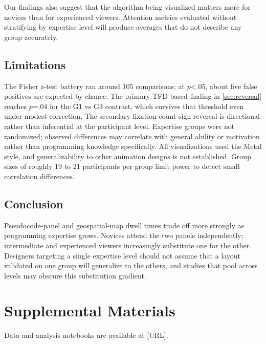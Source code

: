 \documentclass[journal]{vgtc}
\begin{document}
Our findings also suggest that the algorithm being visualized matters more for
novices than for experienced viewers. Attention metrics evaluated without
stratifying by expertise level will produce averages that do not describe any
group accurately.

\subsection{Limitations}

The Fisher z-test battery ran around 105 comparisons; at $p$<.05, about
five false positives are expected by chance. The primary TFD-based finding
in \cref{sec:reversal} reaches $p$=.04 for the G1 vs G3 contrast, which
survives that threshold even under modest correction. The secondary
fixation-count sign reversal is directional rather than inferential at the
participant level.
Expertise groups were not randomized; observed differences may correlate
with general ability or motivation rather than programming knowledge
specifically. All visualizations used the Metal style, and generalizability
to other animation designs is not established. Group sizes of roughly 19
to 21 participants per group limit power to detect small correlation
differences.

\subsection{Conclusion}

Pseudocode-panel and geospatial-map dwell times trade off more strongly as
programming expertise grows. Novices attend the two panels independently;
intermediate and experienced viewers increasingly substitute one for the
other. Designers targeting a single expertise level should not assume that
a layout validated on one group will generalize to the others, and studies
that pool across levels may obscure this substitution gradient.


\section*{Supplemental Materials}

Data and analysis notebooks are available at [URL].


\acknowledgments{%
  [ACKNOWLEDGMENTS]
}




\end{document}
